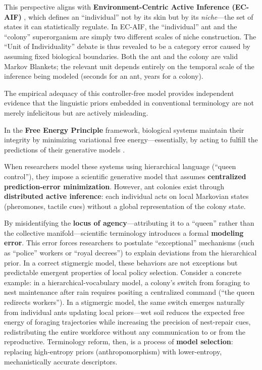 \documentclass[
]{article}
\numberwithin{equation}{section}
\begin{document}
This perspective aligns with \textbf{Environment-Centric Active
Inference (EC-AIF)} \cite{bruineberg2018general}, which defines an
``individual'' not by its skin but by its \emph{niche}---the set of
states it can statistically regulate. In EC-AIF, the ``individual'' ant
and the ``colony'' superorganism are simply two different scales of
niche construction. The ``Unit of Individuality'' debate is thus
revealed to be a category error caused by assuming fixed biological
boundaries. Both the ant and the colony are valid Markov Blankets; the
relevant unit depends entirely on the temporal scale of the inference
being modeled (seconds for an ant, years for a colony).

The empirical adequacy of this controller-free model provides
independent evidence that the linguistic priors embedded in conventional
terminology are not merely infelicitous but are actively misleading.

In the \textbf{Free Energy Principle} framework, biological systems
maintain their integrity by minimizing variational free
energy---essentially, by acting to fulfill the predictions of their
generative models \cite{friston2013life}.

When researchers model these systems using hierarchical language
(``queen control''), they impose a scientific generative model that
assumes \textbf{centralized prediction-error minimization}. However, ant
colonies exist through \textbf{distributed active inference}: each
individual acts on local Markovian states (pheromones, tactile cues)
without a global representation of the colony state.

By misidentifying the \textbf{locus of agency}---attributing it to a
``queen'' rather than the collective manifold---scientific terminology
introduces a formal \textbf{modeling error}. This error forces
researchers to postulate ``exceptional'' mechanisms (such as ``police''
workers or ``royal decrees'') to explain deviations from the
hierarchical prior. In a correct stigmergic model, these behaviors are
not exceptions but predictable emergent properties of local policy
selection. Consider a concrete example: in a hierarchical-vocabulary
model, a colony's switch from foraging to nest maintenance after rain
requires positing a centralized command (``the queen redirects
workers''). In a stigmergic model, the same switch emerges naturally
from individual ants updating local priors---wet soil reduces the
expected free energy of foraging trajectories while increasing the
precision of nest-repair cues, redistributing the entire workforce
without any communication to or from the reproductive. Terminology
reform, then, is a process of \textbf{model selection}: replacing
high-entropy priors (anthropomorphism) with lower-entropy,
mechanistically accurate descriptors.
\end{document}
